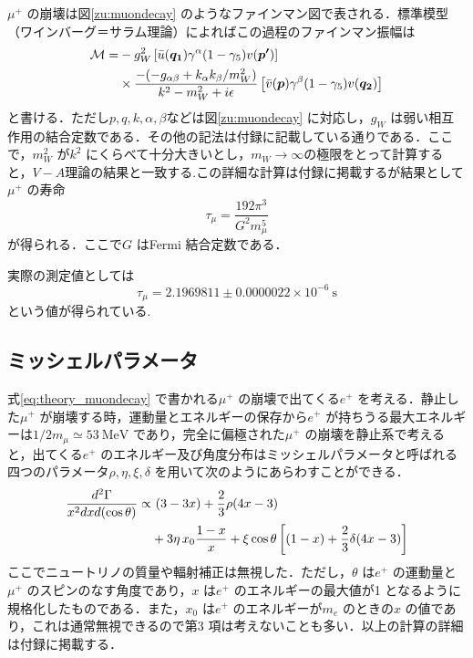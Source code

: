 $\mu^{+}$ の崩壊は図\ref{zu:muondecay} のようなファインマン図で表される．標準模型（ワインバーグ＝サラム理論）によればこの過程のファインマン振幅は
\begin{align}
\mathcal{M} = &-g_{W}^2\left[\Bar{u}(\bm{q_{1}})\gamma^{\alpha}(1 - \gamma_{5})v(\bm{p'})\right] \notag \\ 
&\times \frac{-(-g_{\alpha\beta} + k_{\alpha}k_{\beta}/m_{W}^2)}{k^{2} - m_{W}^2 + i\epsilon}\left[\Bar{v}(\bm{p})\gamma^{\beta}(1 - \gamma_5)v(\bm{q_{2}})\right]
\label{eq:theory_muondecayamp}
\end{align}%
と書ける．ただし$p, q, k, \alpha, \beta$などは図\ref{zu:muondecay} に対応し，$g_{W}$ は弱い相互作用の結合定数である．その他の記法は付録に記載している通りである．ここで，$m_{W}^2$ が$k^2$ にくらべて十分大きいとし，$m_{W} \rightarrow \infty$の極限をとって計算すると，$V-A$理論の結果と一致する.この詳細な計算は付録に掲載するが結果として$\mu^+$ の寿命
\begin{equation}
\tau_{\mu} = \frac{192\pi^3}{G^{2} m_{\mu}^{5}}
\label{eq:thory_muonlifetime}
\end{equation}
が得られる．ここで$G$ はFermi 結合定数である．

実際の測定値としては
\[\tau_{\mu} = 2.1969811 \pm 0.0000022 \times 10^{-6}~\mathrm{s}\]
という値が得られている\cite{PDG}.
	
\subsection{ミッシェルパラメータ}
式\eqref{eq:theory_muondecay} で書かれる$\mu^{+}$ の崩壊で出てくる$e^{+}$ を考える．静止した$\mu^{+}$ が崩壊する時，運動量とエネルギーの保存から$e^{+}$ が持ちうる最大エネルギーは$1/2 m_{\mu} \simeq 53~\mathrm{MeV}$ であり，完全に偏極された$\mu^{+}$ の崩壊を静止系で考えると，出てくる$e^{+}$ のエネルギー及び角度分布はミッシェルパラメータと呼ばれる四つのパラメータ$\rho, \eta, \xi, \delta$ を用いて次のようにあらわすことができる\cite{michel_parameter}．
\begin{align}
\frac{d^2\Gamma}{x^{2}dxd(\cos \theta)} \propto& \,\,(3 - 3x) + \frac{2}{3}\rho (4x - 3) \notag \\
&+ 3 \eta \,x_{0} \frac{1-x}{x} + \xi \cos \theta \left[(1 - x) + \frac{2}{3} \delta (4x - 3)\right]
\label{eq:theory_michel}
\end{align}
ここでニュートリノの質量や輻射補正は無視した．ただし，$\theta$ は$e^{+}$ の運動量と$\mu^{+}$ のスピンのなす角度であり，$x$ は$e^{+}$ のエネルギーの最大値が1 となるように規格化したものである．また，$x_0$ は$e^{+}$ のエネルギーが$m_{e}$ のときの$x$ の値であり，これは通常無視できるので第3 項は考えないことも多い．以上の計算の詳細は付録に掲載する．

